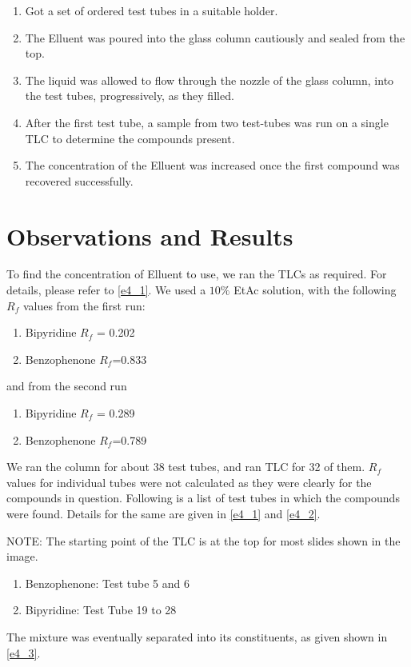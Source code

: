 \begin{enumerate}
		\begin{enumerate}
			\item Got a set of ordered test tubes in a suitable holder.
			\item The Elluent was poured into the glass column cautiously and sealed from the top.
			\item The liquid was allowed to flow through the nozzle of the glass column, into the test tubes, progressively, as they filled.
			\item After the first test tube, a sample from two test-tubes was run on a single TLC to determine the compounds present.
			\item The concentration of the Elluent was increased once the first compound was recovered successfully.
		\end{enumerate}


	\end{enumerate}
\section{Observations and Results}		
	To find the concentration of Elluent to use, we ran the TLCs as required. For details, please refer to \autoref{e4_1}. We used a $10\%$ EtAc solution, with the following $R_f$ values from the first run:
	\begin{enumerate}
		\item Bipyridine $R_f$ = 0.202
		\item Benzophenone $R_f$=0.833
	\end{enumerate}
	and from the second run
	\begin{enumerate}
		\item Bipyridine $R_f$ = 0.289
		\item Benzophenone $R_f$=0.789
	\end{enumerate}
	\par
	We ran the column for about 38 test tubes, and ran TLC for 32 of them. $R_f$ values for individual tubes were not calculated as they were clearly for the compounds in question. Following is a list of test tubes in which the compounds were found. Details for the same are given in \autoref{e4_1} and \autoref{e4_2}.
	\par
	NOTE: The starting point of the TLC is at the top for most slides shown in the image.
	\begin{enumerate}
		\item Benzophenone: Test tube 5 and 6
		\item Bipyridine: Test Tube 19 to 28
	\end{enumerate}
	The mixture was eventually separated into its constituents, as given shown in \autoref{e4_3}.

